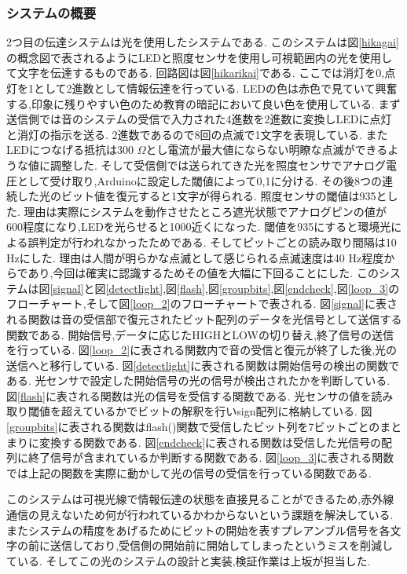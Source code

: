 \subsubsection{システムの概要}

2つ目の伝達システムは光を使用したシステムである.
このシステムは図\ref{hikagai}の概念図で表されるようにLEDと照度センサを使用し可視範囲内の光を使用して文字を伝達するものである.
回路図は図\ref{hikarikai}である.
ここでは消灯を0,点灯を1として2進数として情報伝達を行っている.
LEDの色は赤色で見ていて興奮する,印象に残りやすい色のため教育の暗記において良い色を使用している\cite{iro}.
まず送信側では音のシステムの受信で入力された4進数を2進数に変換しLEDに点灯と消灯の指示を送る.
2進数であるので8回の点滅で1文字を表現している.
またLEDにつなげる抵抗は300 $Ω$とし電流が最大値にならない明瞭な点滅ができるような値に調整した.
そして受信側では送られてきた光を照度センサでアナログ電圧として受け取り,Arduinoに設定した閾値によって0,1に分ける.
その後8つの連続した光のビット値を復元すると1文字が得られる.
照度センサの閾値は935とした.
理由は実際にシステムを動作させたところ遮光状態でアナログピンの値が600程度になり,LEDを光らせると1000近くになった.
閾値を935にすると環境光による誤判定が行われなかったためである.
そしてピットごとの読み取り間隔は10 Hzにした.
理由は人間が明らかな点滅として感じられる点滅速度は40 Hz程度からであり,今回は確実に認識するためその値を大幅に下回ることにした\cite{tira}.
このシステムは図\ref{signal}と図\ref{detectlight},図\ref{flash},図\ref{groupbits},図\ref{endcheck},図\ref{loop_3}のフローチャート,そして図\ref{loop_2}のフローチャートで表される.
図\ref{signal}に表される関数は音の受信部で復元されたビット配列のデータを光信号として送信する関数である.
開始信号,データに応じたHIGHとLOWの切り替え,終了信号の送信を行っている.
図\ref{loop_2}に表される関数内で音の受信と復元が終了した後,光の送信へと移行している.
図\ref{detectlight}に表される関数は開始信号の検出の関数である.
光センサで設定した開始信号の光の信号が検出されたかを判断している.
図\ref{flash}に表される関数は光の信号を受信する関数である.
光センサの値を読み取り閾値を超えているかでビットの解釈を行いsign配列に格納している.
図\ref{groupbits}に表される関数はflash()関数で受信したビット列を7ビットごとのまとまりに変換する関数である.
図\ref{endcheck}に表される関数は受信した光信号の配列に終了信号が含まれているか判断する関数である.
図\ref{loop_3}に表される関数では上記の関数を実際に動かして光の信号の受信を行っている関数である.


このシステムは可視光線で情報伝達の状態を直接見ることができるため,赤外線通信の見えないため何が行われているかわからないという課題を解決している.
またシステムの精度をあげるためにビットの開始を表すプレアンブル信号を各文字の前に送信しており,受信側の開始前に開始してしまったというミスを削減している.
そしてこの光のシステムの設計と実装,検証作業は上坂が担当した.

